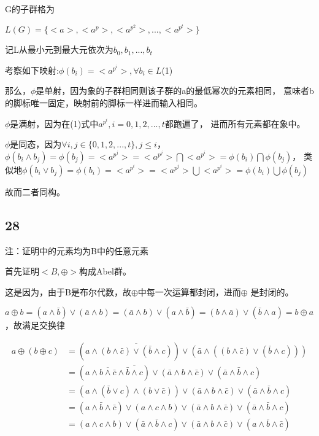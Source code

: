 \documentclass[UTF8]{ctexart}
\begin{document}
G的子群格为

$L(G) = \{<a>, <a^p>, <a^{p^2}>, ..., <a^{p^t}>\}$

记L从最小元到最大元依次为$b_0, b_1, ..., b_t$

考察如下映射:$\phi(b_i) = <a^{p^i}>, \forall b_i\in L$(1)

那么，$\phi$是单射，因为象的子群相同则该子群的a的最低幂次的元素相同，
意味者b的脚标唯一固定，映射前的脚标一样进而输入相同。

$\phi$是满射，因为在(1)式中$a^{p^i}, i = 0, 1, 2, ..., t$都跑遍了，
进而所有元素都在象中。

$\phi$是同态，因为$\forall i, j \in \{0, 1, 2, ..., t\}, j\leq i$，
$\phi(b_i\land b_j) = \phi(b_j) = <a^{p^j}> = <a^{p^j}>\bigcap <a^{p^i}> = \phi(b_i)\bigcap \phi(b_j)$，
类似地$\phi(b_i\lor b_j) = \phi(b_i) = <a^{p^i}> = <a^{p^j}>\bigcup <a^{p^i}> = \phi(b_i)\bigcup \phi(b_j)$

故而二者同构。

\subsection*{28}

注：证明中的元素均为B中的任意元素

首先证明$<B, \oplus >$构成Abel群。

这是因为，由于B是布尔代数，故$\oplus$中每一次运算都封闭，进而$\oplus$
是封闭的。

$a\oplus b = (a\land \bar b) \lor (\bar a \land b) = (\bar a \land b) \lor (a\land \bar b) = (b\land \bar a) \lor (\bar b\land a) = b\oplus a$
，故满足交换律

\[
\begin{aligned}
    a\oplus(b\oplus c) &= (a\land \overline{(b\land \bar c)\lor (\bar b\land c)}) \lor (\bar a \land ((b\land \bar c)\lor (\bar b\land c)))\\
    &= (a\land \overline{b\land \bar c}\land \overline{\bar b\land c})\lor (\bar a\land b\land \bar c)\lor (\bar a\land \bar b\land c)\\
    &= (a\land(\bar b\lor c)\land (b\lor \bar c))\lor (\bar a\land b\land \bar c)\lor (\bar a\land \bar b\land c)\\
    &= (a\land \bar b\land \bar c)\lor (a\land c\land b)\lor (\bar a\land b\land \bar c)\lor (\bar a\land \bar b\land c)\\
    &= (a\land c\land b)\lor (\bar a\land \bar b\land c)\lor (\bar a\land b\land \bar c)\lor (a\land \bar b\land \bar c)
\end{aligned}
\]
\end{document}
